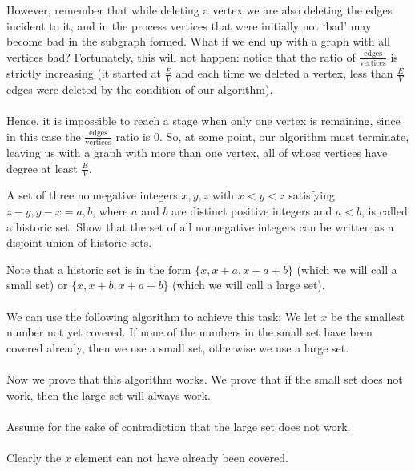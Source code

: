 However, remember that while deleting a vertex we are also deleting the edges incident to it, and in the process vertices that were initially not ‘bad’ may become bad in the subgraph formed. What if we end up with a graph with all vertices bad? Fortunately, this will not happen: notice that the ratio of $\frac{\text{edges}}{\text{vertices}}$ is strictly increasing (it started at $\frac{E}{V}$ and each time we deleted a vertex, less than $\frac{E}{V}$ edges were deleted by the condition of our algorithm). 
\\\\
Hence, it is impossible to reach a stage when only one vertex is remaining, since in this case the $\frac{\text{edges}}{\text{vertices}}$ ratio is 0. So, at some point, our algorithm must terminate, leaving us with a graph with more than one vertex, all of whose vertices have degree at least $\frac{E}{V}$. 

\begin{example} [ISL 2001]
    A set of three nonnegative integers ${x, y, z}$ with $x<y<z$ satisfying ${z-y, y-x} = {a, b}$, where $a$ and $b$ are distinct positive integers and $a < b$, is called a historic set. Show that the set of all nonnegative integers can be written as a disjoint union of historic sets. 
\end{example}

\sol Note that a historic set is in the form $\{x, x+a, x+a+b\}$ (which we will call a small set) or $\{x, x+b, x+a+b\}$ (which we will call a large set).
\\\\
We can use the following algorithm to achieve this task:
We let $x$ be the smallest number not yet covered. If none of the numbers in the small set have been covered already, then we use a small set, otherwise we use a large set.
\\\\
Now we prove that this algorithm works. We prove that if the small set does not work, then the large set will always work.
\\\\
Assume for the sake of contradiction that the large set does not work.
\\\\
Clearly the $x$ element can not have already been covered.

